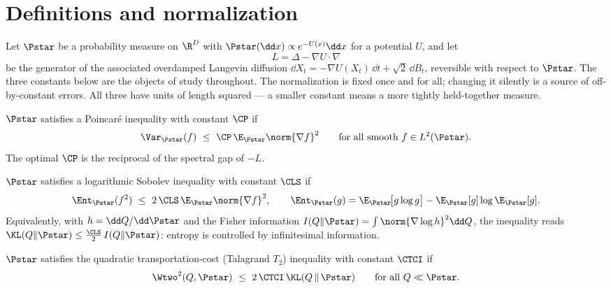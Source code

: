 \documentclass[../main.tex]{subfiles}
\begin{document}
\section{Definitions and normalization}
\label{sec:def}

Let $\Pstar$ be a probability measure on $\R^D$ with $\Pstar(\dd x)\propto e^{-U(x)}\dd x$
for a potential $U$, and let
\[
  L=\Delta-\nabla U\cdot\nabla
\]
be the generator of the associated overdamped Langevin diffusion
$\dd X_t=-\nabla U(X_t)\,\dd t+\sqrt2\,\dd B_t$, reversible with respect to $\Pstar$. The
three constants below are the objects of study throughout. The normalization is fixed once
and for all; changing it silently is a source of off-by-constant errors. All three have
units of length squared --- a smaller constant means a more tightly held-together measure.

\begin{definition}
\label{def:poincare}
$\Pstar$ satisfies a Poincar\'e inequality with constant $\CP$ if
\begin{equation}\label{eq:poincare}
  \Var_{\Pstar}(f)\ \le\ \CP\,\E_{\Pstar}\norm{\nabla f}^2
  \qquad\text{for all smooth } f\in L^2(\Pstar).
\end{equation}
The optimal $\CP$ is the reciprocal of the spectral gap of $-L$.
\end{definition}

\begin{definition}
\label{def:lsi}
$\Pstar$ satisfies a logarithmic Sobolev inequality with constant $\CLS$ if
\begin{equation}\label{eq:lsi}
  \Ent_{\Pstar}(f^2)\ \le\ 2\,\CLS\,\E_{\Pstar}\norm{\nabla f}^2 ,
  \qquad
  \Ent_{\Pstar}(g)=\E_{\Pstar}\!\big[g\log g\big]-\E_{\Pstar}[g]\log\E_{\Pstar}[g].
\end{equation}
Equivalently, with $h=\dd Q/\dd\Pstar$ and the Fisher information
$I(Q\|\Pstar)=\int\norm{\nabla\log h}^2\dd Q$, the inequality reads
$\KL(Q\|\Pstar)\le\tfrac{\CLS}{2}\,I(Q\|\Pstar)$: entropy is controlled by infinitesimal
information.
\end{definition}

\begin{definition}
\label{def:tci}
$\Pstar$ satisfies the quadratic transportation-cost (Talagrand $T_2$) inequality with
constant $\CTCI$ if
\begin{equation}\label{eq:tci}
  \Wtwo^2(Q,\Pstar)\ \le\ 2\,\CTCI\,\KL(Q\,\|\,\Pstar)
  \qquad\text{for all } Q\ll\Pstar .
\end{equation}
\end{definition}
\end{document}
